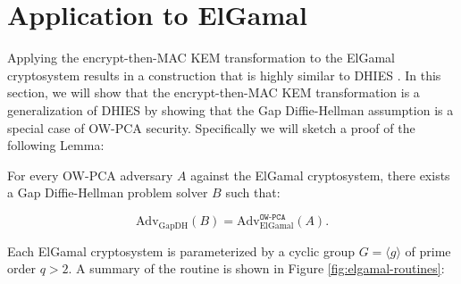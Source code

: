 \documentclass[runningheads]{llncs}
\begin{document}

\section{Application to ElGamal}\label{sec:application-to-elgamal}
Applying the encrypt-then-MAC KEM transformation to the ElGamal cryptosystem results in a construction that is highly similar to DHIES \cite{DBLP:conf/ctrsa/AbdallaBR01}. In this section, we will show that the encrypt-then-MAC KEM transformation is a generalization of DHIES by showing that the Gap Diffie-Hellman assumption is a special case of OW-PCA security. Specifically we will sketch a proof of the following Lemma:

\begin{lemma}\label{lemma:elgamal-is-ow-pca}
    For every OW-PCA adversary $A$ against the ElGamal cryptosystem, there exists a Gap Diffie-Hellman problem solver $B$ such that:

    \begin{equation*}
        \text{Adv}_\text{GapDH}(B) = \text{Adv}_\text{ElGamal}^\texttt{OW-PCA}(A).
    \end{equation*}
\end{lemma}

Each ElGamal cryptosystem \cite{DBLP:journals/tit/Elgamal85} is parameterized by a cyclic group $G = \langle g \rangle$ of prime order $q > 2$. A summary of the routine is shown in Figure \ref{fig:elgamal-routines}:
\end{document}

